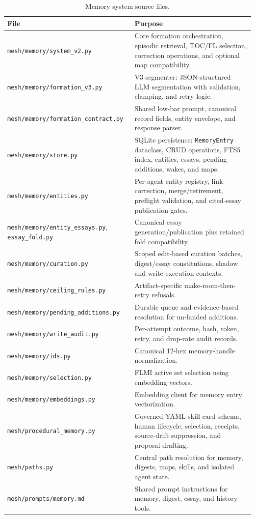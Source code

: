 \documentclass[11pt,letterpaper]{report}
\newcommand{\code}[1]{\texttt{#1}}
\begin{document}
\begin{table}[h]
\centering
\small
\begin{tabular}{@{}lL{7cm}@{}}
\toprule
\textbf{File} & \textbf{Purpose} \\
\midrule
\code{mesh/memory/system\_v2.py}
  & Core formation orchestration, episodic retrieval, TOC/FL selection,
    correction operations, and optional map compatibility. \\
\code{mesh/memory/formation\_v3.py}
  & V3 segmenter: JSON-structured LLM segmentation with validation,
    clamping, and retry logic. \\
\code{mesh/memory/formation\_contract.py}
  & Shared low-bar prompt, canonical record fields, entity envelope, and
    response parser. \\
\code{mesh/memory/store.py}
  & SQLite persistence: \code{MemoryEntry} dataclass, CRUD operations,
    FTS5 index, entities, essays, pending additions, wakes, and maps. \\
\code{mesh/memory/entities.py}
  & Per-agent entity registry, link correction, merge/retirement,
    preflight validation, and cited-essay publication gates. \\
\code{mesh/memory/entity\_essays.py}, \code{essay\_fold.py}
  & Canonical essay generation/publication plus retained fold compatibility. \\
\code{mesh/memory/curation.py}
  & Scoped edit-based curation batches, digest/essay constitutions, shadow and
    write execution contexts. \\
\code{mesh/memory/ceiling\_rules.py}
  & Artifact-specific make-room-then-retry refusals. \\
\code{mesh/memory/pending\_additions.py}
  & Durable queue and evidence-based resolution for un-landed additions. \\
\code{mesh/memory/write\_audit.py}
  & Per-attempt outcome, hash, token, retry, and drop-rate audit records. \\
\code{mesh/memory/ids.py}
  & Canonical 12-hex memory-handle normalization. \\
\code{mesh/memory/selection.py}
  & FLMI active set selection using embedding vectors. \\
\code{mesh/memory/embeddings.py}
  & Embedding client for memory entry vectorization. \\
\code{mesh/procedural\_memory.py}
  & Governed YAML skill-card schema, human lifecycle, selection, receipts,
    source-drift suppression, and proposal drafting. \\
\code{mesh/paths.py}
  & Central path resolution for memory, digests, maps, skills, and isolated
    agent state. \\
\code{mesh/prompts/memory.md}
  & Shared prompt instructions for memory, digest, essay, and history tools. \\
\bottomrule
\end{tabular}
\caption{Memory system source files.}
\label{tab:memory-files}
\end{table}
\end{document}
